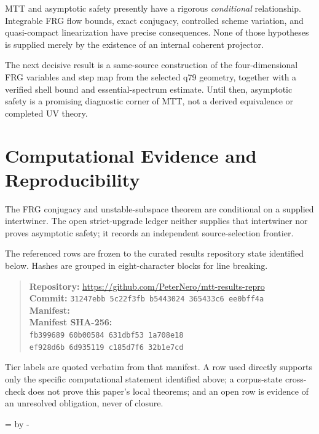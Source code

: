 \documentclass[11pt]{article}
\theoremstyle{definition}
\theoremstyle{remark}
\begin{document}
MTT and asymptotic safety presently have a rigorous \emph{conditional}
relationship. Integrable FRG flow bounds, exact conjugacy, controlled scheme
variation, and quasi-compact linearization have precise consequences.
None of those hypotheses is supplied merely by the existence of an internal
coherent projector.

The next decisive result is a same-source construction of the
four-dimensional FRG variables and step map from the selected q79 geometry,
together with a verified shell bound and essential-spectrum estimate. Until
then, asymptotic safety is a promising diagnostic corner of MTT, not a
derived equivalence or completed UV theory.

\clearpage

\section*{Computational Evidence and Reproducibility}
The FRG conjugacy and unstable-subspace theorem are conditional on a supplied intertwiner. The open strict-upgrade ledger neither supplies that intertwiner nor proves asymptotic safety; it records an independent source-selection frontier.

The referenced rows are frozen to the curated results repository state identified below. Hashes are grouped in eight-character blocks for line breaking.
\begin{quote}\small
\textbf{Repository:} \url{https://github.com/PeterNero/mtt-results-repro}\\
\textbf{Commit:} \texttt{31247ebb 5c22f3fb b5443024 365433c6 ee0bff4a}\\
\textbf{Manifest:} \\
\textbf{Manifest SHA-256:}\\
\texttt{fb399689 60b00584 631dbf53 1a708e18}\\
\texttt{ef928d6b 6d935119 c185d7f6 32b1e7cd}
\end{quote}

Tier labels are quoted verbatim from that manifest. A row used directly supports only the specific computational statement identified above; a corpus-state cross-check does not prove this paper's local theorems; and an open row is evidence of an unresolved obligation, never of closure.

\par\begingroup{}=\pagegoal\advance{} by -\pagetotal\ifdim\dimen0<7\baselineskip\newpage\fi\endgroup
\end{document}

